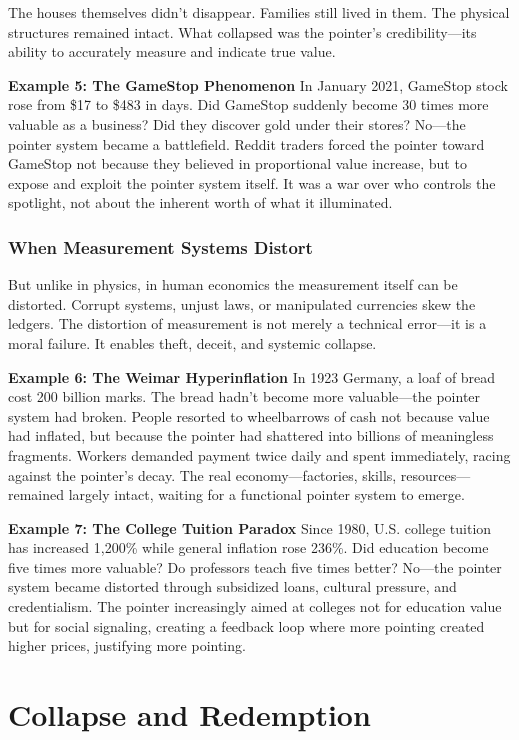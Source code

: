 \documentclass[11pt,oneside]{book}
\begin{document}
The houses themselves didn't disappear. Families still lived in them. The physical structures remained intact. What collapsed was the pointer's credibility—its ability to accurately measure and indicate true value.

\textbf{Example 5: The GameStop Phenomenon}
In January 2021, GameStop stock rose from \$17 to \$483 in days. Did GameStop suddenly become 30 times more valuable as a business? Did they discover gold under their stores? No—the pointer system became a battlefield. Reddit traders forced the pointer toward GameStop not because they believed in proportional value increase, but to expose and exploit the pointer system itself. It was a war over who controls the spotlight, not about the inherent worth of what it illuminated.

\subsubsection{When Measurement Systems Distort}

But unlike in physics, in human economics the measurement itself can be distorted. Corrupt systems, unjust laws, or manipulated currencies skew the ledgers. The distortion of measurement is not merely a technical error—it is a moral failure. It enables theft, deceit, and systemic collapse.

\textbf{Example 6: The Weimar Hyperinflation}
In 1923 Germany, a loaf of bread cost 200 billion marks. The bread hadn't become more valuable—the pointer system had broken. People resorted to wheelbarrows of cash not because value had inflated, but because the pointer had shattered into billions of meaningless fragments. Workers demanded payment twice daily and spent immediately, racing against the pointer's decay. The real economy—factories, skills, resources—remained largely intact, waiting for a functional pointer system to emerge.

\textbf{Example 7: The College Tuition Paradox}
Since 1980, U.S. college tuition has increased 1,200\% while general inflation rose 236\%. Did education become five times more valuable? Do professors teach five times better? No—the pointer system became distorted through subsidized loans, cultural pressure, and credentialism. The pointer increasingly aimed at colleges not for education value but for social signaling, creating a feedback loop where more pointing created higher prices, justifying more pointing.

\section{Collapse and Redemption}
\end{document}
